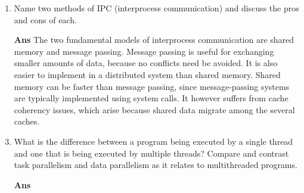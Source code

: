 \documentclass[paper=usletter, fontsize=12pt]{extarticle}
\begin{document}
\begin{enumerate}[label=\textbf{\arabic*}]
        \item Name two methods of IPC (interprocess communication) and discuss
        the pros and cons of each.
        \item[\textbf{Ans}]
        The two fundamental models of interprocess communication are shared
        memory and message passing. Message passing is useful for exchanging
        smaller amounts of data, because no conflicts need be avoided. It is
        also easier to implement in a distributed system than shared memory.
        Shared memory can be faster than message passing, since message-passing
        systems are typically implemented using system calls. It however
        suffers from cache coherency issues, which arise because shared data
        migrate among the several caches.
        \vspace{0.2in}

        \item What is the difference between a program being executed by a
        single thread and one that is being executed by multiple threads?
        Compare and contrast task parallelism and data parallelism as it
        relates to multithreaded programs.
        \item[\textbf{Ans}]
        \vspace{0.2in}

    \end{enumerate}
\end{document}
